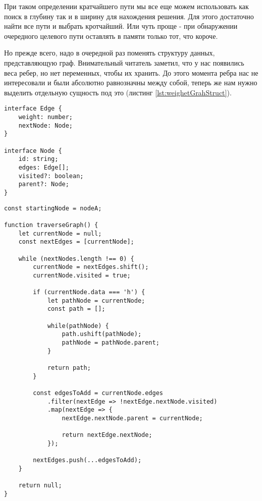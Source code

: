 \documentclass[../article.tex]{subfiles}
\begin{document}
При таком определении кратчайшего пути мы все еще можем использовать как поиск в глубину так и в ширину для нахождения решения. Для этого достаточно найти все пути и выбрать кротчайший. Или чуть проще - при обнаружении очередного целевого пути оставлять в памяти только тот, что короче.

Но прежде всего, надо в очередной раз поменять структуру данных, представляющую граф. Внимательный читатель заметил, что у нас появились веса ребер, но нет переменных, чтобы их хранить. До этого момента ребра нас не интересовали и были абсолютно равнозначны между собой, теперь же нам нужно выделить отдельную сущность под это (листинг \ref{lst:weighetGrahStruct}).

\begin{ruledelement}
    \begin{lstlisting}[caption={Структура для взвешенного графа}, label={lst:weighetGrahStruct}]
interface Edge {
    weight: number;
    nextNode: Node;
}

interface Node {
    id: string;
    edges: Edge[];
    visited?: boolean;
    parent?: Node;
}
    \end{lstlisting}
\end{ruledelement}

\begin{figure*}[h]
    \begin{ruledelement}
        \begin{lstlisting}[caption={Поиск пути при обходе взвешенного графа в ширину}, label={lst:bfsWeightedRandomPath}]
const startingNode = nodeA;

function traverseGraph() {
    let currentNode = null;
    const nextEdges = [currentNode];

    while (nextNodes.length !== 0) {
        currentNode = nextEdges.shift();
        currentNode.visited = true;

        if (currentNode.data === 'h') {
            let pathNode = currentNode;
            const path = [];

            while(pathNode) {
                path.ushift(pathNode);
                pathNode = pathNode.parent;
            }

            return path;
        }

        const edgesToAdd = currentNode.edges
            .filter(nextEdge => !nextEdge.nextNode.visited)
            .map(nextEdge => {
                nextEdge.nextNode.parent = currentNode;

                return nextEdge.nextNode;
            });

        nextEdges.push(...edgesToAdd);
    }

    return null;
}
        \end{lstlisting}
    \end{ruledelement}

\end{figure*}
\end{document}
